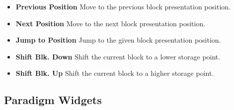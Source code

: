 \documentclass[a4paper,12pt,english]{sphinxmanual}
\begin{document}
\begin{itemize}
\item {} 
\textbf{Previous Position} Move to the previous block presentation
position.

\item {} 
\textbf{Next Position} Move to the next block presentation position.

\item {} 
\textbf{Jump to Position} Jump to the given block presentation position.

\item {} 
\textbf{Shift Blk. Down} Shift the current block to a lower storage point.

\item {} 
\textbf{Shift Blk. Up} Shift the current block to a higher storage point.

\end{itemize}


\subsection{Paradigm Widgets}
\label{graphical_user_interface:paradigm-widgets}
\end{document}
